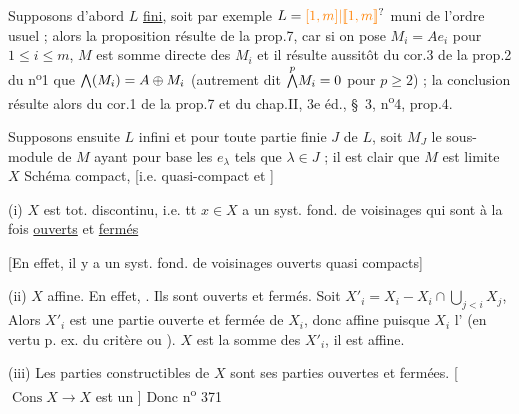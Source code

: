 Supposons d'abord $L$ \uline{fini}, soit par exemple $L=\unsure{[1,m]|[\![1,m]\!]}$ muni de l'ordre usuel ; alors la proposition résulte de la prop.7, car si on pose $M_i=Ae_i$ pour $1\leq i\leq m$, $M$ est somme directe des $M_i$ et il résulte aussitôt du cor.3 de la prop.2 du n\textsuperscript{o}1 que $\bigwedge(M_i)=A\oplus M_i$ (autrement dit $\overset{p}{\bigwedge}M_i=0$ pour $p\geq 2$) ; la conclusion résulte alors du cor.1 de la prop.7 et du chap.II, 3e éd., \S~3, n\textsuperscript{o}4, prop.4.

Supposons ensuite $L$ infini et pour toute partie finie $J$ de $L$, soit $M_J$ le sous-module de $M$ ayant pour base les $e_\lambda$ tels que $\lambda\in J$ ; il est clair que $M$ est limite
$X$ Schéma compact, [i.e. quasi-compact et  ]

(i) $X$ est tot. discontinu,  i.e. tt $x\in X$ a un syst. fond. de voisinages qui sont à la fois \uline{ouverts} et \uline{fermés}

[En effet, il y a un syst. fond. de voisinages ouverts quasi compacts]

(ii) $X$  affine. En effet, . Ils sont ouverts et fermés. Soit
$X'_i=X_i-X_i\cap\bigcup_{j<i}X_j$, Alors $X'_i$ est une partie ouverte et fermée de $X_i$, donc affine puisque $X_i$ l' (en vertu p. ex. du critère  \deleted{\unsure{,}} ou ).  $X$ est  la somme des $X'_i$, il est affine.

(iii) Les parties constructibles de $X$ sont ses parties ouvertes et fermées. [ $\operatorname{Cons} X\to X$ est un \deleted{\unsure{homéom.}]} ] Donc
n\textsuperscript{o} 371

